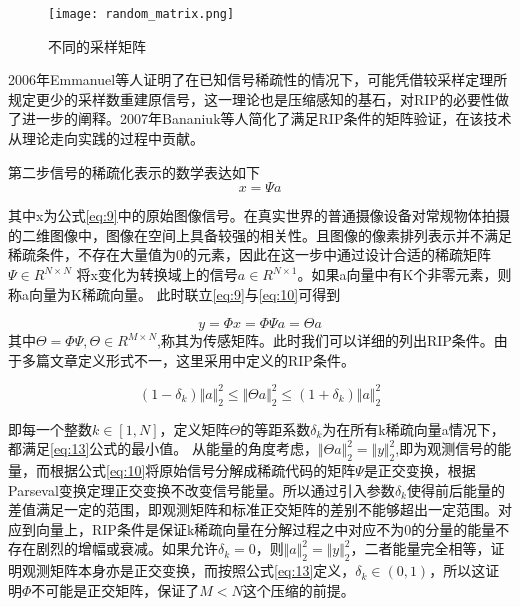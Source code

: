\begin{figure}[ht]
  \centering
  \texttt{[image: random\_matrix.png]}
  \label{fig:random_sample_matrix}
  \caption{不同的采样矩阵}
\end{figure}

2006年Emmanuel等人\cite{Emmanuel2006Stable}证明了在已知信号稀疏性的情况下，可能凭借较采样定理所规定更少的采样数重建原信号，这一理论也是压缩感知的基石，对RIP的必要性做了进一步的阐释。2007年Bananiuk等人\cite{2008A}简化了满足RIP条件的矩阵验证，在该技术从理论走向实践的过程中贡献。


第二步信号的稀疏化表示的数学表达如下
\begin{equation}
  \label{eq:10}
  x = \Psi a
\end{equation}

其中x为公式\ref{eq:9}中的原始图像信号。在真实世界的普通摄像设备对常规物体拍摄的二维图像中，图像在空间上具备较强的相关性。且图像的像素排列表示并不满足稀疏条件，不存在大量值为0的元素，因此在这一步中通过设计合适的稀疏矩阵$\Psi \in R^{N \times N}$
将x变化为转换域上的信号$a \in R^{N \times 1}$。如果a向量中有K个非零元素，则称a向量为K稀疏向量。
此时联立\ref{eq:9}与\ref{eq:10}可得到

\begin{equation}
  \label{eq:14}
  y = \Phi x = \Phi \Psi a = \Theta a
\end{equation}
其中$\Theta = \Phi \Psi, \Theta \in R^{M \times N}$,称其为传感矩阵。此时我们可以详细的列出RIP条件。由于多篇文章定义形式不一，这里采用\cite{The_restricted_isometry_property_and_its_implications_for_compressed_sensing}中定义的RIP条件。

\begin{equation}
  \label{eq:13}
  (1-\delta_k) \Vert a \Vert_2^2 \leq \Vert \Theta a \Vert_2^2 \leq (1+\delta_k) \Vert a \Vert_2^2
\end{equation}

即每一个整数$k \in \left[1,N\right]$，定义矩阵$\Theta$的等距系数$\delta_{k}$为在所有k稀疏向量a情况下，都满足\ref{eq:13}公式的最小值。
从能量的角度考虑，$\Vert \Theta a \Vert_2^2 = \Vert y\Vert_2^2$,即为观测信号的能量，而根据公式\ref{eq:10}将原始信号分解成稀疏代码的矩阵$\Psi$是正交变换，根据Parseval变换定理正交变换不改变信号能量。所以通过引入参数$\delta_k$使得前后能量的差值满足一定的范围，即观测矩阵和标准正交矩阵的差别不能够超出一定范围。对应到向量上，RIP条件是保证k稀疏向量在分解过程之中对应不为0的分量的能量不存在剧烈的增幅或衰减。如果允许$\delta_k = 0$，则$\Vert a \Vert_2^2 = \Vert y\Vert_2^2$，二者能量完全相等，证明观测矩阵本身亦是正交变换，而按照公式\ref{eq:13}定义，$\delta_k \in (0,1)$，所以这证明$\Phi$不可能是正交矩阵，保证了$M < N$这个压缩的前提。


